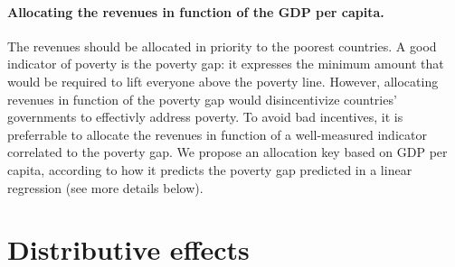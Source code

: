 \documentclass[12pt,english]{article}
\begin{document}
\paragraph{Allocating the revenues in function of the GDP per capita.} The revenues should be allocated in priority to the poorest countries. A good indicator of poverty is the poverty gap: it expresses the minimum amount that would be required to lift everyone above the poverty line. However, allocating revenues in function of the poverty gap would disincentivize countries' governments to effectivly address poverty. To avoid bad incentives, it is preferrable to allocate the revenues in function of a well-measured indicator correlated to the poverty gap. We propose an allocation key based on GDP per capita, according to how it predicts the poverty gap predicted in a linear regression (see more details below). 





\section{Distributive effects}\label{sec:distribution}
\end{document}
